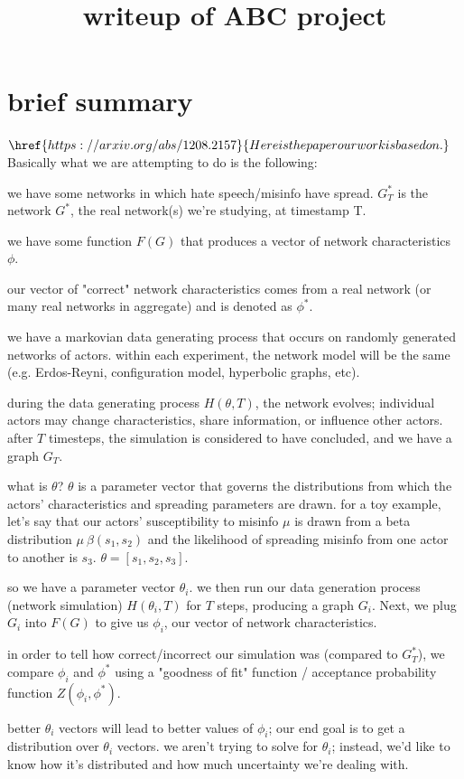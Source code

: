 \documentclass{article}
\title{writeup of ABC project}
\begin{document}
\maketitle
\section{brief summary}
$\href{https://arxiv.org/abs/1208.2157}{Here is the paper our work is based on.}$ Basically what we are attempting to do is the following:

we have some networks in which hate speech/misinfo have spread. $G^{*}_{T}$ is the network $G^*$, the real network(s) we're studying, at timestamp T.

we have some function $F(G)$ that produces a vector of network characteristics $\phi$.   

our vector of "correct" network characteristics comes from a real network (or many real networks in aggregate) and is denoted as $\phi^*$. 

we have a markovian data generating process that occurs on randomly generated networks of actors. within each experiment, the network model will be the same (e.g. Erdos-Reyni, configuration model, hyperbolic graphs, etc).

during the data generating process $H(\theta, T)$, the network evolves; individual actors may change characteristics, share information, or influence other actors. after $T$ timesteps, the simulation is considered to have concluded, and we have a graph $G_T$.

what is $\theta$? $\theta$ is a parameter vector that governs the distributions from which the actors' characteristics and spreading parameters are drawn. for a toy example, let's say that our actors' susceptibility to misinfo $\mu$ is drawn from a beta distribution $\mu ~ \beta(s_1, s_2)$ and the likelihood of spreading misinfo from one actor to another is $s_3$. $\theta = [s_1, s_2, s_3]$.  

so we have a parameter vector $\theta_i$. we then run our data generation process (network simulation) $H(\theta_i, T)$ for $T$ steps, producing a graph $G_i$. Next, we plug $G_i$ into $F(G)$ to give us $\phi_i$, our vector of network characteristics. 

in order to tell how correct/incorrect our simulation was (compared to $G^*_T$), we compare $\phi_i$ and $\phi^*$ using a "goodness of fit" function / acceptance probability function $Z(\phi_i, \phi^*)$. 

better $\theta_i$ vectors will lead to better values of $\phi_i$; our end goal is to get a distribution over $\theta_i$ vectors. we aren't trying to solve for $\theta_i$; instead, we'd like to know how it's distributed and how much uncertainty we're dealing with.
\end{document}
